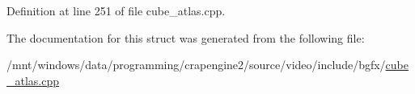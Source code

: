 Definition at line 251 of file cube\+\_\+atlas.\+cpp.



The documentation for this struct was generated from the following file\+:\begin{DoxyCompactItemize}
\item 
/mnt/windows/data/programming/crapengine2/source/video/include/bgfx/\hyperlink{cube__atlas_8cpp}{cube\+\_\+atlas.\+cpp}\end{DoxyCompactItemize}
